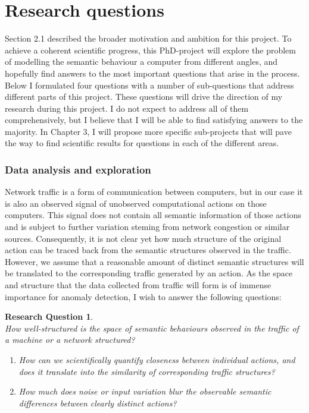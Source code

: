 \documentclass[a4paper,12pt,twoside]{report}
\newtheorem{rquestion}{Research Question}
\begin{document}
\section{Research questions}\label{RQ}

Section 2.1 described the broader motivation and ambition for this project. To achieve a coherent scientific progress, this PhD-project will explore the problem of modelling the semantic behaviour a computer from different angles, and hopefully find answers to the most important questions that arise in the process. Below I formulated four questions with a number of sub-questions that address different parts of this project. These questions will drive the direction of my research during this project. I do not expect to address all of them comprehensively, but I believe that I will be able to find satisfying answers to the majority. In Chapter 3, I will propose more specific sub-projects that will pave the way to find scientific results for questions in each of the different areas.


\subsubsection{Data analysis and exploration}

Network traffic is a form of communication between computers, but in our case it is also an observed signal of unobserved computational actions on those computers. This signal does not contain all semantic information of those actions and is subject to further variation steming from network congestion or similar sources. Consequently, it is not clear yet how  much structure of the original action can be traced back from the semantic structures observed in the traffic. However, we assume that a reasonable amount of distinct semantic structures will be translated to the corresponding traffic generated by an action. As the space and structure that the data collected from traffic will form is of immense importance for anomaly detection, I wish to answer the following questions:

\begin{rquestion}\ \\ 
How well-structured is the space of semantic behaviours observed in the traffic of a machine or a network structured? 
\begin{enumerate}
\item How can we scientifically quantify closeness between individual actions, and does it translate into the similarity of corresponding traffic structures? 
\item How much does noise or input variation blur the observable semantic differences between clearly distinct actions?
\end{enumerate}
\end{rquestion}
\end{document}
